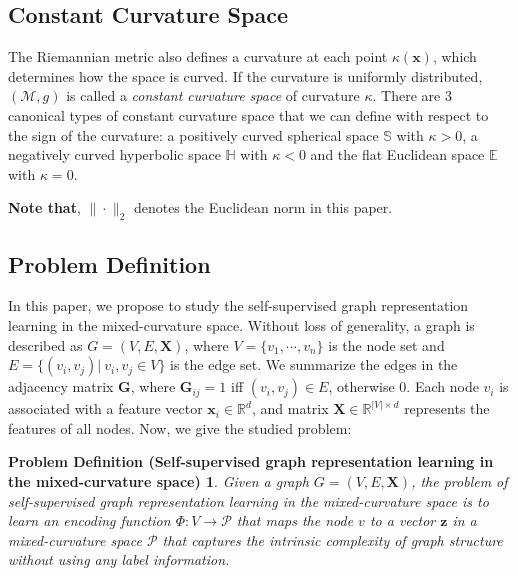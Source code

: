 \subsection{Constant Curvature Space}

The Riemannian metric also defines a curvature at each point $\kappa(\mathbf x)$, 
which determines how the space is curved.
If the curvature is uniformly distributed,  
$(\mathcal M, g)$ is called a \emph{constant curvature space} of curvature $\kappa$. 
There are $3$ canonical types of constant curvature space that we can define with respect to the sign of the curvature: 
a positively curved spherical space $\mathbb S$ with $\kappa>0$, 
a negatively curved hyperbolic space $\mathbb H$ with $\kappa<0$ 
and the flat Euclidean space $\mathbb E$  with $\kappa=0$.

\noindent\textbf{Note that}, $\| \cdot \|_2$ denotes the Euclidean norm in this paper.

\subsection{Problem Definition}
In this paper, we propose to study the self-supervised graph representation learning in the mixed-curvature space.
Without loss of generality,
a graph is described as $G = (V, E, \mathbf X)$, 
where $V = \{v_1,  \cdots, v_n\}$ is the node set and $E =\{ (v_i,  v_j ) | \  v_i,  v_j \in V\}$ is the edge set. 
We summarize the edges in the adjacency matrix $\mathbf G$, where $\mathbf G_{ij}=1$ iff $(v_i,  v_j ) \in E$, otherwise $0$.
Each node $v_i$ is associated with a feature vector $\mathbf x_i \in \mathbb R^d$, and matrix $\mathbf{X} \in \mathbb{R}^{|V| \times d}$ represents the features of all nodes.
Now, we give the studied problem:
\newtheorem*{def1}{Problem Definition (Self-supervised graph representation learning in the mixed-curvature space)} 
\begin{def1}
Given a graph $G = (V, E, \mathbf X)$, 
the problem of self-supervised graph representation learning in the mixed-curvature space
is to learn an encoding function $\Phi: V \to \mathcal P$ that maps the node $v$ to a vector $\boldsymbol z$ in a mixed-curvature space $\mathcal P$ that captures the intrinsic complexity of graph structure without using any label information. 
\end{def1}


